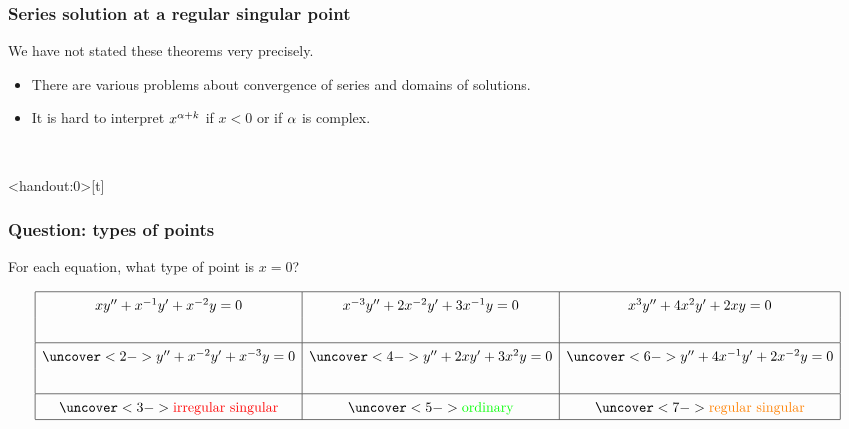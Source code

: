 \documentclass[9pt]{beamer}
\begin{document}
\begin{frame}[t]
 \frametitle{Series solution at a regular singular point}
 {We have not stated these theorems very precisely.}
 \begin{itemize}
  \item<2-> There are various problems about convergence of series and
   domains of solutions.
  \item<3-> It is hard to interpret $x^{\alpha+k}$ if $x<0$ or if $\alpha$
   is complex. 
 \end{itemize}
 \\
\end{frame}

\begin{frame}<handout:0>[t]
 \frametitle{Question: types of points}

 For each equation, what type of point is $x=0$?

 {\small \[ \renewcommand{\arraystretch}{1.5}
  \begin{array}{|c|c|c|} \hline
   xy''+x^{-1}y'+x^{-2}y=0 &
   x^{-3}y''+2x^{-2}y'+3x^{-1}y=0 &
   x^3y''+4x^2y'+2xy=0 \\ && \\ \hline
   \uc<2->{y''+x^{-2}y'+x^{-3}y=0} &
   \uc<4->{y''+2xy'+3x^2y=0} &
   \uc<6->{y''+4x^{-1}y'+2x^{-2}y=0} \\ && \\ \hline
   \uc<3->{\text{\RED{irregular singular}}} &
   \uc<5->{\text{\GREEN{ordinary}}} &
   \uc<7->{\text{\ORANGE{regular singular}}} \\ \hline
  \end{array}
 \]}


 \bigskip

\end{frame}
\end{document}
